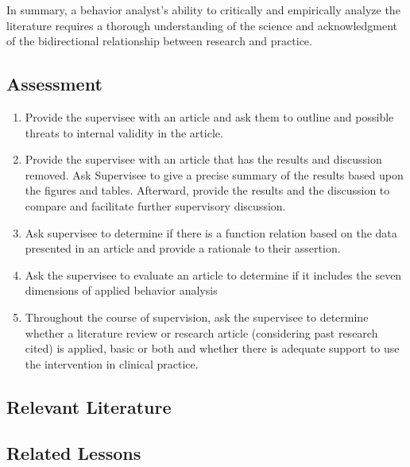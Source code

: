      In summary, a behavior analyst's ability to critically and empirically analyze the literature requires a thorough understanding of the science and acknowledgment of the bidirectional relationship between research and practice. 
%
\subsection{Assessment}
\begin{enumerate}
\item Provide the supervisee with an article and ask them to outline and possible threats to internal validity in the article. 
\item Provide the supervisee with an article that has the results and discussion removed. Ask Supervisee to give a precise summary of the results based upon the figures and tables. Afterward, provide the results and the discussion to compare and facilitate further supervisory discussion. 
\item Ask supervisee to determine if there is a function relation based on the data presented in an article and provide a rationale to their assertion. 
\item Ask the supervisee to evaluate an article to determine if it includes the seven dimensions of applied behavior analysis
\item Throughout the course of supervision, ask the supervisee to determine whether a literature review or research article (considering past research cited) is applied, basic or both and whether there is adequate support to use the intervention in clinical practice. 
\end{enumerate}
%
\subsection{Relevant Literature}
\begin{refsection}
\nocite{cooper2007applied,baer1968some,johnston2010strategies}
\printbibliography[heading=none]
\end{refsection}
%
\subsection{Related Lessons} 
\fourbOne{}\\
\fourhFour{}\\
\fouriFive{}\\
\fourFKFour{}\\
\fourFKNine{}\\
\fourFKThirtyThree{}\\

